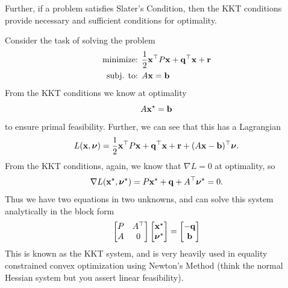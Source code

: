 \documentclass{article}
\begin{document}
Further, if a problem satisfies Slater's Condition, then the KKT conditions provide necessary
and sufficient conditions for optimality.

\begin{example}
    Consider the task of solving the problem
    \begin{align*}
        \text{minimize: } & \frac{1}{2}{\bf x}^\top P{\bf x} + {\bf q}^\top{\bf x} + {\bf r}\\
        \text{subj. to: } & A{\bf x} = {\bf b}\\
    \end{align*}
    From the KKT conditions we know at optimality
    \[
        A{\bf x}^\star = {\bf b}
    \]
    to ensure primal feasibility.
    Further, we can see that this has a Lagrangian
    \[
        L({\bf x}, \hbox{\boldmath$\nu$}) = \frac{1}{2}{\bf x}^\top P{\bf x} + {\bf q}^\top{\bf x} + {\bf r} + (A{\bf x} - {\bf b})^\top\hbox{\boldmath$\nu$}.
    \]
    From the KKT conditions, again, we know that $\nabla L = 0$
    at optimality, so
    \[
        \nabla L({\bf x}^\star, \hbox{\boldmath$\nu$}^\star) = P{\bf x}^\star + {\bf q} + A^\top\hbox{\boldmath$\nu$}^\star = 0.
    \]
    Thus we have two equations in two unknowns, and can solve this
    system analytically in the block form
    \[
        \begin{bmatrix} P & A^\top \\ A & 0 \end{bmatrix} \begin{bmatrix} {\bf x}^\star \\ \hbox{\boldmath$\nu$}^\star \end{bmatrix} = \begin{bmatrix} -{\bf q} \\ {\bf b} \end{bmatrix}
    \]
    This is known as the KKT system, and is very heavily used in
    equality constrained convex optimization using Newton's Method
    (think the normal Hessian system but you assert linear feasibility).
\end{example}
\end{document}
